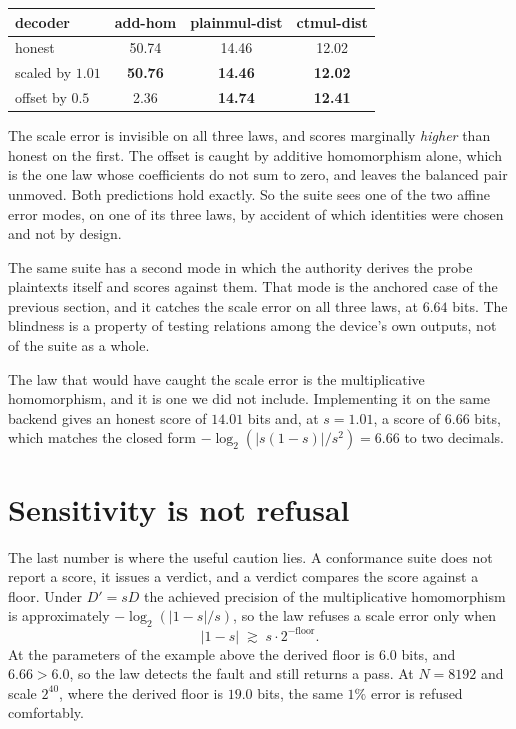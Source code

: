 \documentclass[11pt,a4paper]{article}
\begin{document}
\begin{center}
\begin{tabular}{@{}lccc@{}}
\toprule
decoder & add-hom & plainmul-dist & ctmul-dist \\
\midrule
honest                & 50.74 & 14.46 & 12.02 \\
scaled by $1.01$      & \textbf{50.76} & \textbf{14.46} & \textbf{12.02} \\
offset by $0.5$       & 2.36  & \textbf{14.74} & \textbf{12.41} \\
\bottomrule
\end{tabular}
\end{center}

The scale error is invisible on all three laws, and scores marginally \emph{higher} than honest on
the first. The offset is caught by additive homomorphism alone, which is the one law whose
coefficients do not sum to zero, and leaves the balanced pair unmoved. Both predictions hold
exactly. So the suite sees one of the two affine error modes, on one of its three laws, by accident
of which identities were chosen and not by design.

The same suite has a second mode in which the authority derives the probe plaintexts itself and
scores against them. That mode is the anchored case of the previous section, and it catches the
scale error on all three laws, at $6.64$ bits. The blindness is a property of testing relations
among the device's own outputs, not of the suite as a whole.

The law that would have caught the scale error is the multiplicative homomorphism, and it is one we
did not include. Implementing it on the same backend gives an honest score of $14.01$ bits and, at
$s = 1.01$, a score of $6.66$ bits, which matches the closed form $-\log_2(|s(1-s)|/s^2) = 6.66$ to
two decimals.

\section{Sensitivity is not refusal}

The last number is where the useful caution lies. A conformance suite does not report a score, it
issues a verdict, and a verdict compares the score against a floor. Under $D' = sD$ the achieved
precision of the multiplicative homomorphism is approximately $-\log_2(|1-s|/s)$, so the law refuses
a scale error only when
\[
|1 - s| \;\gtrsim\; s \cdot 2^{-\mathrm{floor}}.
\]
At the parameters of the example above the derived floor is $6.0$ bits, and $6.66 > 6.0$, so the law
detects the fault and still returns a pass. At $N = 8192$ and scale $2^{40}$, where the derived floor
is $19.0$ bits, the same $1\%$ error is refused comfortably.
\end{document}
